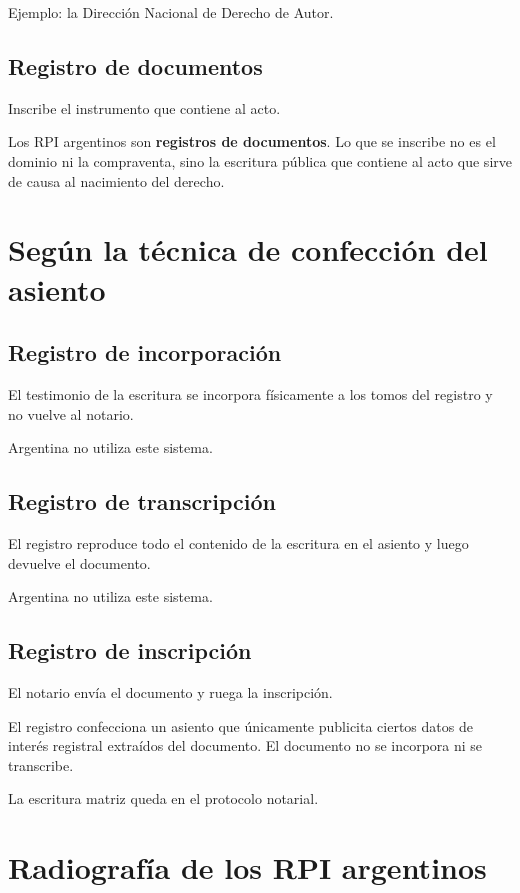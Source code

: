 \documentclass[12pt]{book}
\begin{document}
Ejemplo: la Direcci\'on Nacional de Derecho de Autor.

\subsection{Registro de documentos}

Inscribe el instrumento que contiene al acto.

Los RPI argentinos son \textbf{registros de documentos}. Lo que se inscribe no es el dominio ni la compraventa, sino la escritura p\'ublica que contiene al acto que sirve de causa al nacimiento del derecho.

\section{Seg\'un la t\'ecnica de confecci\'on del asiento}

\subsection{Registro de incorporaci\'on}

El testimonio de la escritura se incorpora f\'isicamente a los tomos del registro y no vuelve al notario.

Argentina no utiliza este sistema.

\subsection{Registro de transcripci\'on}

El registro reproduce todo el contenido de la escritura en el asiento y luego devuelve el documento.

Argentina no utiliza este sistema.

\subsection{Registro de inscripci\'on}

El notario env\'ia el documento y ruega la inscripci\'on.

El registro confecciona un asiento que \'unicamente publicita ciertos datos de inter\'es registral extra\'idos del documento. El documento no se incorpora ni se transcribe.

La escritura matriz queda en el protocolo notarial.

\section{Radiograf\'ia de los RPI argentinos}
\end{document}
